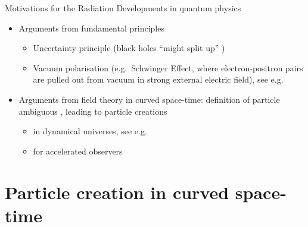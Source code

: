 \documentclass{beamer}
\begin{document}
\begin{frame}{Motivations for the Radiation}%
{Developments in quantum physics}

\begin{itemize}
\item Arguments from fundamental principles
	\begin{itemize}
	\item Uncertainty principle (black holes ``might split up''
		\cite{susskind2008black})
	\item Vacuum polarisation (e.g.\ Schwinger Effect, where electron-positron
	pairs are pulled out from vacuum in strong external electric field), see
	e.g.\ \cite{Frolov1998}
	\end{itemize}

\item Arguments from field theory in curved space-time:
definition of particle ambiguous \cite{Fulling1973}, leading to particle
creations
	\begin{itemize}
	\item in dynamical universes, see e.g.\ \cite{parker2009quantum}
	\item for accelerated observers \cite{Fulling1973,Davies1975,Unruh1976}
	\end{itemize}
\end{itemize}

\end{frame}


\section{Particle creation in curved space-time}
\end{document}
